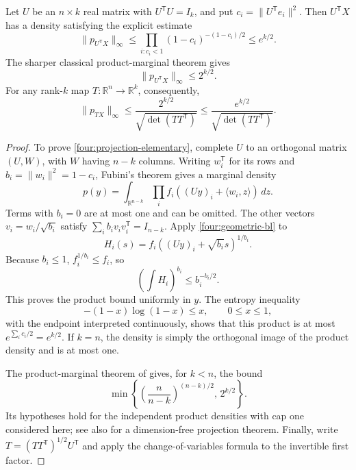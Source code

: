 \begin{lemma}\label{four:projection}
Let \(U\) be an \(n\times k\) real matrix with
\(U^{\mathsf T}U=I_k\), and put
\(c_i=\|U^{\mathsf T}e_i\|^2\).  Then \(U^{\mathsf T}X\) has a
density satisfying the explicit estimate
\begin{equation}\label{four:projection-elementary}
 \|p_{U^{\mathsf T}X}\|_\infty
 \leq\prod_{i:c_i<1}(1-c_i)^{-(1-c_i)/2}
 \leq e^{k/2}.
\end{equation}
The sharper classical product-marginal theorem \citep{LPP2016} gives
\begin{equation}\label{four:projection-sharp}
 \|p_{U^{\mathsf T}X}\|_\infty\leq2^{k/2}.
\end{equation}
For any rank-\(k\) map \(T:\mathbb R^n\to\mathbb R^k\), consequently,
\begin{equation}\label{four:linear-density}
 \|p_{TX}\|_\infty
 \leq\frac{2^{k/2}}{\sqrt{\det(TT^{\mathsf T})}}
 \leq\frac{e^{k/2}}{\sqrt{\det(TT^{\mathsf T})}}.
\end{equation}
\end{lemma}
\begin{proof}
To prove \eqref{four:projection-elementary}, complete \(U\)
to an orthogonal matrix \((U,W)\), with \(W\) having \(n-k\) columns.
Writing \(w_i^{\mathsf T}\) for its rows and \(b_i=\|w_i\|^2=1-c_i\),
Fubini's theorem gives a marginal density
\[
 p(y)=\int_{\mathbb R^{n-k}}
             \prod_i f_i((Uy)_i+\langle w_i,z\rangle)\,dz.
\]
Terms with \(b_i=0\) are at most one and can be omitted.  The other
vectors \(v_i=w_i/\sqrt{b_i}\) satisfy
\(\sum_i b_iv_iv_i^{\mathsf T}=I_{n-k}\).  Apply
\eqref{four:geometric-bl} to
\[
 H_i(s)=f_i((Uy)_i+\sqrt{b_i}s)^{1/b_i}.
\]
Because \(b_i\leq1\), \(f_i^{1/b_i}\leq f_i\), so
\[
 \left(\int H_i\right)^{b_i}
 \leq b_i^{-b_i/2}.
\]
This proves the product bound uniformly in \(y\).  The entropy
inequality
\begin{equation}\label{four:entropy}
 -(1-x)\log(1-x)\leq x,\qquad 0\leq x\leq1,
\end{equation}
with the endpoint interpreted continuously, shows that this product
is at most \(e^{\sum_i c_i/2}=e^{k/2}\).
If \(k=n\), the density is simply the orthogonal image of the product
density and is at most one.

The product-marginal theorem of \citet[Theorem 1.1]{LPP2016}
gives, for \(k<n\), the bound
\[
 \min\left\{
       \left(\frac{n}{n-k}\right)^{(n-k)/2},\,2^{k/2}
      \right\}.
\]
Its hypotheses hold for the independent product densities with cap
one considered here; see also \citet{RV2015} for a dimension-free
projection theorem.
Finally, write \(T=(TT^{\mathsf T})^{1/2}U^{\mathsf T}\) and apply
the change-of-variables formula to the invertible first factor.
\end{proof}

